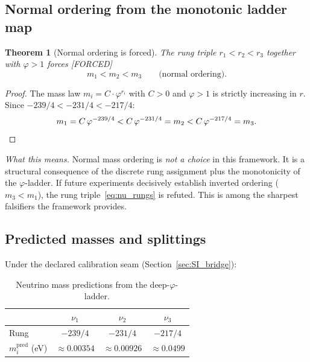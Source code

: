 \documentclass[11pt,a4paper]{article}
\newtheorem{theorem}{Theorem}[section]
\theoremstyle{definition}
\theoremstyle{remark}
\newcommand{\phig}{\varphi}
\newcommand{\FORCED}{\textcolor{red!70!black}{\footnotesize\textsf{[FORCED]}}}
\begin{document}
\subsection{Normal ordering from the monotonic ladder map}

\begin{theorem}[Normal ordering is forced]
\label{thm:normal_ordering}
The rung triple $r_1 < r_2 < r_3$ together with $\phig > 1$ forces
\FORCED{}
\begin{equation}
  m_1 < m_2 < m_3 \qquad\text{(normal ordering)}.
  \label{eq:normal_ordering}
\end{equation}
\end{theorem}

\begin{proof}
The mass law $m_i = C \cdot \phig^{r_i}$ with $C > 0$ and $\phig > 1$ is
strictly increasing in $r$.  Since
$-239/4 < -231/4 < -217/4$:
\[
  m_1 = C\,\phig^{-239/4} < C\,\phig^{-231/4} = m_2 < C\,\phig^{-217/4} = m_3. \qedhere
\]
\end{proof}

\noindent\textit{What this means.}\quad
Normal mass ordering is \emph{not a choice} in this framework.  It is a
structural consequence of the discrete rung assignment plus the monotonicity
of the $\phig$-ladder.  If future experiments decisively establish inverted
ordering ($m_3 < m_1$), the rung triple~\eqref{eq:nu_rungs} is refuted.
This is among the sharpest falsifiers the framework provides.

\subsection{Predicted masses and splittings}

Under the declared calibration seam (Section~\ref{sec:SI_bridge}):

\begin{table}[h]
\centering
\caption{Neutrino mass predictions from the deep-$\phig$-ladder.}
\label{tab:nu_masses}
\begin{tabular}{lccc}
\toprule
& $\nu_1$ & $\nu_2$ & $\nu_3$ \\
\midrule
Rung & $-239/4$ & $-231/4$ & $-217/4$ \\
$m_i^{\mathrm{pred}}$ (eV) & $\approx 0.00354$ & $\approx 0.00926$ &
  $\approx 0.0499$ \\
\bottomrule
\end{tabular}
\end{table}
\end{document}
